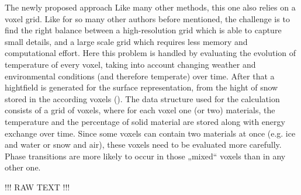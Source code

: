 The newly proposed approach
Like many other methods, this one also relies on a voxel grid. Like for so many other authors before mentioned, the challenge is to find the right balance between a high-resolution grid which is able to capture small details, and a large scale grid which requires less memory and computational effort.
Here this problem is handled by evaluating the evolution of temperature of every voxel, taking into account changing weather and environmental conditions (and therefore temperate) over time. After that a hightfield is generated for the surface representation, from the hight of snow stored in the according voxels ().
The data structure used for the calculation consists of a grid of voxels, where for each voxel one (or two) materials, the temperature and the percentage of solid material are stored along with energy exchange over time. Since some voxels can contain two materials at once (e.g. ice and water or snow and air), these voxels need to be evaluated more carefully. Phase transitions are more likely to occur in those „mixed“ voxels than in any other one.

!!! RAW TEXT !!!